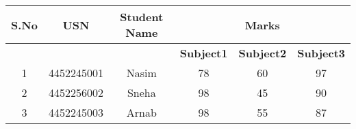 \documentclass{article}
\begin{document}
\begin{tabular}{|c|c|c|c|c|c|}
\hline
\textbf{S.No} & \textbf{USN} & \textbf{Student Name} & \multicolumn{3}{c|}{\textbf{Marks}} \\ \hline
              &              &                       & \textbf{Subject1} & \textbf{Subject2} & \textbf{Subject3} \\ \hline
1             & 4452245001   & Nasim                 & 78                & 60                & 97                \\ \hline
2             & 4452256002   & Sneha                 & 98                & 45                & 90                \\ \hline
3             & 4452245003   & Arnab                 & 98                & 55                & 87                \\ \hline

\end{tabular}
\end{document}
